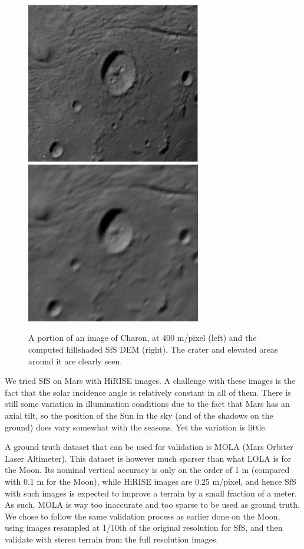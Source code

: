 \documentclass[12pt,oneside]{article}
\begin{document}
\begin{figure}[h!]
\begin{center}
\includegraphics[width=3in]{figures/sfs_charon_img.jpg}
\includegraphics[width=3in]{figures/sfs_charon_dem.jpg}
\caption[sfs]{A portion of an image of Charon, at 400 m/pixel (left) and the computed hillshaded SfS DEM (right). The crater and elevated areas around it are clearly seen.}
\label{fig:sfscharon}
\end{center}
\end{figure}

We tried SfS on Mars with HiRISE images. A challenge with these images
is the fact that the solar incidence angle is relatively constant in all
of them. There is still some variation in illumination conditions due to
the fact that Mars has an axial tilt, so the position of the Sun in the
sky (and of the shadows on the ground) does vary somewhat with the
seasons. Yet the variation is little.

A ground truth dataset that can be used for validation is MOLA (Mars
Orbiter Laser Altimeter). This dataset is however much sparser than what
LOLA is for the Moon. Its nominal vertical accuracy is only on the order
of 1 m (compared with 0.1 m for the Moon), while HiRISE images are 0.25
m/pixel, and hence SfS with such images is expected to improve a terrain
by a small fraction of a meter. As such, MOLA is way too inaccurate and
too sparse to be used as ground truth. We chose to follow the same
validation process as earlier done on the Moon, using images resampled
at 1/10th of the original resolution for SfS, and then validate with
stereo terrain from the full resolution images.
\end{document}
